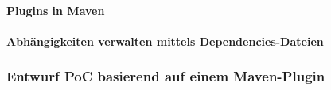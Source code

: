 \paragraph{Plugins in Maven}













\paragraph{Abhängigkeiten verwalten mittels Dependencies-Dateien}

\subsubsection{Entwurf PoC basierend auf einem Maven-Plugin}




